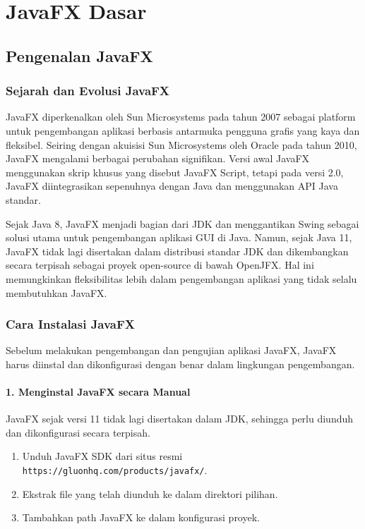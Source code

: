 \chapter{JavaFX Dasar}

\section{Pengenalan JavaFX}

\subsection{Sejarah dan Evolusi JavaFX}

JavaFX diperkenalkan oleh Sun Microsystems pada tahun 2007 sebagai platform untuk pengembangan aplikasi berbasis antarmuka pengguna grafis yang kaya dan fleksibel. Seiring dengan akuisisi Sun Microsystems oleh Oracle pada tahun 2010, JavaFX mengalami berbagai perubahan signifikan. Versi awal JavaFX menggunakan skrip khusus yang disebut JavaFX Script, tetapi pada versi 2.0, JavaFX diintegrasikan sepenuhnya dengan Java dan menggunakan API Java standar.

Sejak Java 8, JavaFX menjadi bagian dari JDK dan menggantikan Swing sebagai solusi utama untuk pengembangan aplikasi GUI di Java. Namun, sejak Java 11, JavaFX tidak lagi disertakan dalam distribusi standar JDK dan dikembangkan secara terpisah sebagai proyek open-source di bawah OpenJFX. Hal ini memungkinkan fleksibilitas lebih dalam pengembangan aplikasi yang tidak selalu membutuhkan JavaFX.

\subsection{Cara Instalasi JavaFX}

Sebelum melakukan pengembangan dan pengujian aplikasi JavaFX, JavaFX harus diinstal dan dikonfigurasi dengan benar dalam lingkungan pengembangan.

\subsubsection{1. Menginstal JavaFX secara Manual}

JavaFX sejak versi 11 tidak lagi disertakan dalam JDK, sehingga perlu diunduh dan dikonfigurasi secara terpisah.

\begin{enumerate}
	\item Unduh JavaFX SDK dari situs resmi \texttt{https://gluonhq.com/products/javafx/}.
	\item Ekstrak file yang telah diunduh ke dalam direktori pilihan.
	\item Tambahkan path JavaFX ke dalam konfigurasi proyek.
\end{enumerate}

